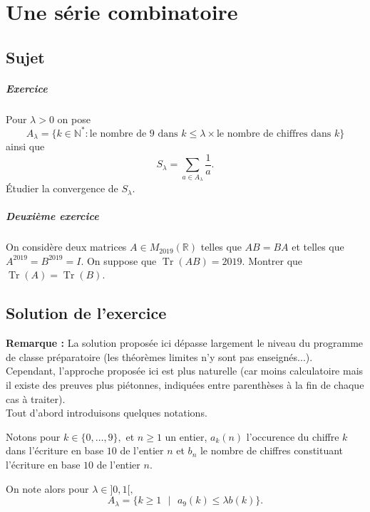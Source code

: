 \chapter{Une série combinatoire}

\section{Sujet}

\paragraph{Exercice}
Pour \( \lambda > 0 \) on pose
\[
    A_\lambda = \{k \in \mathbb{N}^{*} : \text{le nombre de 9  dans } k \leqslant \lambda \times \text{le nombre de chiffres dans } k\}
\]
ainsi que
\[ S_\lambda = \sum_{a\in A_\lambda} \dfrac1 a. \]
Étudier la convergence de \( S_\lambda \).

\paragraph{Deuxième exercice}
On considère deux matrices \( A \in M_{2019}(\mathbb R) \) telles que \( AB = BA \) et telles
que \( A^{2019} = B^{2019} = I \). On suppose que \( \operatorname{Tr}(AB) = 2019 \). Montrer que \( \operatorname{Tr}(A) = \operatorname{Tr}(B) \).

\section{Solution de l'exercice}

\textbf{Remarque : } La solution proposée ici dépasse largement le niveau du programme de classe préparatoire (les théorèmes limites n'y sont pas enseignés...). Cependant, l'approche proposée ici est plus naturelle (car moins calculatoire mais il existe des preuves plus piétonnes, indiquées entre parenthèses à la fin de chaque cas  à traiter).\\

Tout d'abord introduisons quelques notations.

Notons pour $k\in\{0,\ldots,9\},$ et $n\geq 1$ un entier, $\displaystyle a_{k}(n)$ l'occurence du chiffre $k$ dans l'écriture en base $10$ de l'entier $n$ et $b_{n}$ le nombre de chiffres constituant l'écriture en base $10$  de l'entier $n.$

On note alors pour $\lambda\in]0,1[,$ $$ A_{\lambda}=\{k\geq 1\mbox{ }|\mbox{ }a_{9}(k)\leq \lambda b(k)\}.$$

